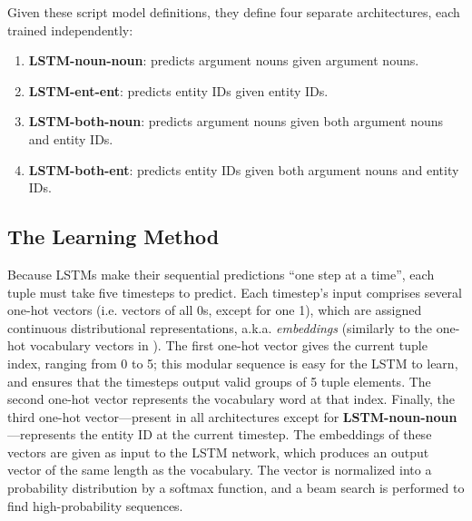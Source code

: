Given these script model definitions, they define four separate architectures, each trained independently:

\begin{enumerate}
    \item \textbf{LSTM-noun-noun}: predicts argument nouns given argument nouns.
    \item \textbf{LSTM-ent-ent}: predicts entity IDs given entity IDs.
    \item \textbf{LSTM-both-noun}: predicts argument nouns given both argument nouns and entity IDs.
    \item \textbf{LSTM-both-ent}: predicts entity IDs given both argument nouns and entity IDs.
\end{enumerate}

\subsection{The Learning Method}
Because LSTMs make their sequential predictions ``one step at a time'', each tuple must take five timesteps to predict. Each timestep's input comprises several one-hot vectors (i.e. vectors of all 0s, except for one 1), which are assigned continuous distributional representations, a.k.a. \textit{embeddings} (similarly to the one-hot vocabulary vectors in \citep{mikolov2013}). The first one-hot vector gives the current tuple index, ranging from 0 to 5; this modular sequence is easy for the LSTM to learn, and ensures that the timesteps output valid groups of 5 tuple elements. The second one-hot vector represents the vocabulary word at that index. Finally, the third one-hot vector---present in all architectures except for \textbf{LSTM-noun-noun}---represents the entity ID at the current timestep. The embeddings of these vectors are given as input to the LSTM network, which produces an output vector of the same length as the vocabulary. The vector is normalized into a probability distribution by a softmax function, and a beam search is performed to find high-probability sequences.

